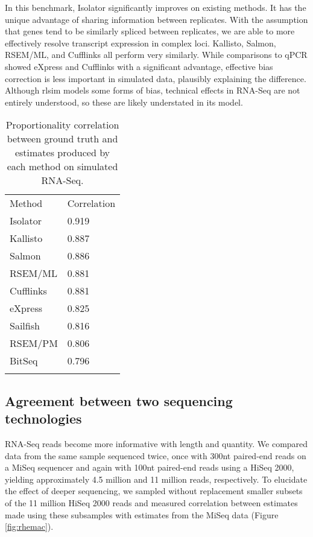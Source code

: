\documentclass[twocolumn]{article}
\begin{document}
In this benchmark, Isolator significantly improves on existing methods.
It has the unique advantage of sharing information between replicates.
With the assumption that genes tend to be similarly spliced between
replicates, we are able to more effectively resolve transcript
expression in complex loci. Kallisto, Salmon, RSEM/ML, and Cufflinks all
perform very similarly. While comparisons to qPCR showed eXpress and
Cufflinks with a significant advantage, effective bias correction is
less important in simulated data, plausibly explaining the difference.
Although rlsim models some forms of bias, technical effects in RNA-Seq
are not entirely understood, so these are likely understated in its model.

\begin{table}\begin{tabular}[c]{@{}ll@{}}
\toprule\addlinespace
Method & Correlation
\\\addlinespace
\midrule
Isolator & 0.919
\\\addlinespace
Kallisto & 0.887
\\\addlinespace
Salmon & 0.886
\\\addlinespace
RSEM/ML & 0.881
\\\addlinespace
Cufflinks & 0.881
\\\addlinespace
eXpress & 0.825
\\\addlinespace
Sailfish & 0.816
\\\addlinespace
RSEM/PM & 0.806
\\\addlinespace
BitSeq & 0.796
\\\addlinespace
\bottomrule
\addlinespace
\end{tabular}
\caption{Proportionality correlation between ground truth and estimates
produced by each method on simulated RNA-Seq.}
\label{table:rlsim}
\end{table}

\subsection{Agreement between two sequencing
technologies}\label{agreement-between-two-sequencing-technologies}

RNA-Seq reads become more informative with length and quantity. We
compared data from the same sample sequenced twice, once with 300nt
paired-end reads on a MiSeq sequencer and again with 100nt paired-end
reads using a HiSeq 2000, yielding approximately 4.5 million and 11
million reads, respectively. To elucidate the effect of deeper
sequencing, we sampled without replacement smaller subsets of the 11
million HiSeq 2000 reads and measured correlation between estimates made using
these subsamples with estimates from the MiSeq data (Figure \ref{fig:rhemac}).
\end{document}
